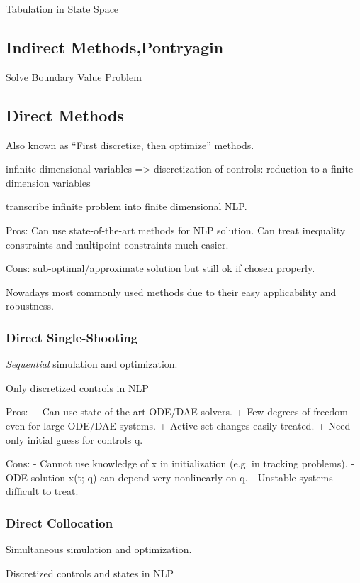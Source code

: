 Tabulation in State Space

\subsection{Indirect Methods,Pontryagin}

Solve Boundary Value Problem

\subsection{Direct Methods}

Also known as “First discretize, then optimize” methods.

infinite-dimensional variables => discretization of controls: reduction to a finite
dimension variables

transcribe infinite problem into finite dimensional NLP.

Pros:
Can use state-of-the-art methods for NLP solution.
Can treat inequality constraints and multipoint constraints much
easier.

Cons:
sub-optimal/approximate solution but still ok if chosen properly.

Nowadays most commonly used methods due to their easy
applicability and robustness.

\subsubsection{Direct Single-Shooting}

\emph{Sequential} simulation and optimization.

Only discretized controls in NLP

Pros:
+ Can use state-of-the-art ODE/DAE solvers.
+ Few degrees of freedom even for large ODE/DAE systems.
+ Active set changes easily treated.
+ Need only initial guess for controls q.

Cons:
- Cannot use knowledge of x in initialization (e.g. in tracking
problems).
- ODE solution x(t; q) can depend very nonlinearly on q.
- Unstable systems difﬁcult to treat.

\subsubsection{Direct Collocation}

Simultaneous simulation and optimization.

Discretized controls and states in NLP


